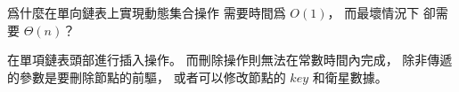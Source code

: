 \startEXERCISE
爲什麼在單向鏈表上實現動態集合操作  需要時間爲 $O(1)$，
而最壞情況下  卻需要 $\Theta(n)$？
\stopEXERCISE

\startANSWER
在單項鏈表頭部進行插入操作。
而刪除操作則無法在常數時間內完成，
除非傳遞的參數是要刪除節點的前驅，
或者可以修改節點的 $key$ 和衛星數據。
\stopANSWER
